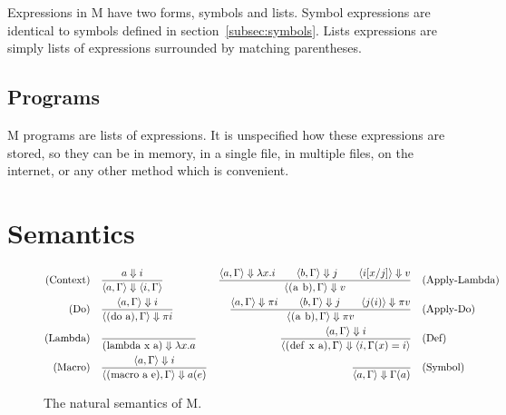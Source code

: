 \documentclass{article}
\begin{document}
\begin{multicols}{2}
        Expressions in M have two forms, symbols and lists.
        Symbol expressions are identical to symbols defined in section~\ref{subsec:symbols}.
        Lists expressions are simply lists of expressions surrounded by matching parentheses.

        \subsection{Programs}\label{subsec:programs}

        M programs are lists of expressions.
        It is unspecified how these expressions are stored, so they can be in memory, in a single file, in multiple files, on the internet, or any other method which is convenient.
    \end{multicols}
    \newpage

    \section{Semantics}\label{sec:semantics}

    \begin{figure}[h]
        \centering
        \begin{align*}
            \text{(Context)}\quad&\dfrac{a\Downarrow i}{\langle a,\Gamma\rangle\Downarrow\langle i,\Gamma\rangle}
            &\dfrac{\langle a,\Gamma\rangle\Downarrow\lambda x.i\qquad\langle b,\Gamma\rangle\Downarrow j\qquad\langle i[x/j]\rangle\Downarrow v}{\langle\lstinline$(a b)$,\Gamma\rangle\Downarrow v}\quad&\text{(Apply-Lambda)}\\
            \text{(Do)}\quad&\dfrac{\langle a,\Gamma\rangle\Downarrow i}{\langle\lstinline$(do a)$,\Gamma\rangle\Downarrow\pi i}
            &\dfrac{\langle a,\Gamma\rangle\Downarrow\pi i\qquad\langle b,\Gamma\rangle\Downarrow j\qquad\langle j(i)\rangle\Downarrow\pi v}{\langle\lstinline$(a b)$,\Gamma\rangle\Downarrow\pi v}\quad&\text{(Apply-Do)}\\
            \text{(Lambda)}\quad&\dfrac{}{\lstinline$(lambda x a)$\Downarrow\lambda x.a}
            &\dfrac{\langle a,\Gamma\rangle\Downarrow i}{\langle\lstinline$(def x a)$,\Gamma\rangle\Downarrow\langle i,\Gamma(x) = i\rangle}\quad&\text{(Def)}\\
            \text{(Macro)}\quad&\dfrac{\langle a,\Gamma\rangle\Downarrow i}{\langle\lstinline$(macro a e)$,\Gamma\rangle\Downarrow a(e)}
            &\dfrac{}{\langle a,\Gamma\rangle\Downarrow\Gamma(a)}\quad&\text{(Symbol)}
        \end{align*}
        \caption{The natural semantics of M.}
    \end{figure}
\end{document}
